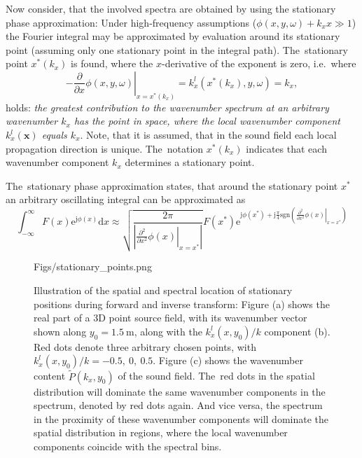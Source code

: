 \documentclass[12pt,a4paper]{article}
\newcommand{\td}{\mathrm{d}}
\newcommand{\te}{\mathrm{e}}
\newcommand{\ti}{\mathrm{j}}
\newcommand{\vx}{\mathbf{x}}
\begin{document}
Now consider, that the involved spectra are obtained by using the stationary phase approximation:
Under high-frequency assumptions ($\phi(x,y,\omega)+k_x x \gg 1$) the Fourier integral may be approximated by evaluation around its stationary point (assuming only one stationary point in the integral path).
The~stationary point $x^*(k_x)$ is found, where the $x$-derivative of the exponent is zero, i.e.\ where
\begin{equation}
- \left. \frac{\partial}{\partial x} \phi(x,y,\omega) \right|_{x = x^*(k_x)} = k_x^l(x^*(k_x),y,\omega) = k_x,
\end{equation}
holds: \emph{the greatest contribution to the wavenumber spectrum at an arbitrary wavenumber $k_x$ has the point in space, where the local wavenumber component $k_x^l(\vx)$ equals $k_x$}.
Note, that it is assumed, that in the sound field each local propagation direction is unique.
The~notation $x^*(k_x)$ indicates that each wavenumber component $k_x$ determines a stationary point.

The~stationary phase approximation states, that around the stationary point $x^*$ an arbitrary oscillating integral can be approximated as 
\begin{equation}
\int_{-\infty}^{\infty} F(x)\te^{\ti \phi(x)} \td x \approx \sqrt{\frac{2\pi}{| \left. \frac{\partial^2}{\partial x^2} \phi(x)\right|_{x = x^*}|  }}
F(x^*) \te^{\ti \phi(x^*) + 
\ti \frac{\pi}{4} \text{sgn}\left( \left. \frac{\partial^2}{\partial x^2} \phi(x)\right|_{x = x^*} \right)}
\end{equation}

\begin{figure}
	\centering
	\begin{overpic}[width = 1\columnwidth]{Figs/stationary_points.png}
	\scriptsize
	\end{overpic}
	\caption{Illustration of the spatial and spectral location of stationary positions during forward and inverse transform: Figure (a) shows the real part of a 3D point source field, with its wavenumber vector shown along $y_0 = 1.5~\mathrm{m}$, along with the $k^l_x(x,y_0)/k$ component (b).
Red dots denote three arbitrary chosen points, with $k^l_x(x,y_0)/k = -0.5,\ 0,\ 0.5$.
Figure (c) shows the wavenumber content $\tilde{P}(k_x,y_0)$ of the sound field.
The~red dots in the spatial distribution will dominate the same wavenumber components in the spectrum, denoted by red dots again.
And vice versa, the spectrum in the proximity of these wavenumber components will dominate the spatial distribution in regions, where the local wavenumber components coincide with the spectral bins.}
	\label{fig:stationary_positions}
\end{figure}
\end{document}
